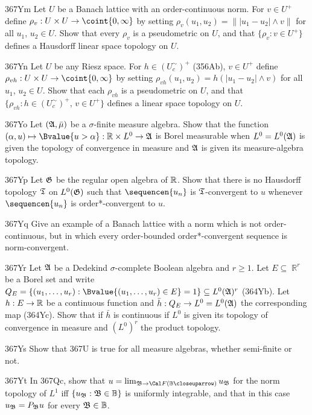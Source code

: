 {\spheader 367Ym Let $U$ be a Banach lattice with an order-continuous
norm.   For $v\in U^+$ define $\rho_v:U\times U\to\coint{0,\infty}$ by
setting $\rho_v(u_1,u_2)=\||u_1-u_2|\wedge v\|$ for all $u_1$, 
$u_2\in U$.   Show that every $\rho_v$ is a pseudometric on $U$, and that $\{\rho_v:v\in U^+\}$ defines a Hausdorff linear space topology on $U$.
     
\spheader 367Yn Let $U$ be any Riesz space.   For $h\in(U^{\sim}_c)^+$
(356Ab), $v\in U^+$ define $\rho_{vh}:U\times U\to\coint{0,\infty}$ by
setting $\rho_{vh}(u_1,u_2)=h(|u_1-u_2|\wedge v)$ for all $u_1$, $u_2\in
U$.   Show that each $\rho_{vh}$ is a pseudometric on $U$, and that
$\{\rho_{vh}:h\in(U^{\sim}_c)^+,\,v\in U^+\}$ defines a linear space
topology on $U$.
     
\spheader 367Yo Let $(\frak A,\bar\mu)$ be a $\sigma$-finite measure
algebra.   Show that the function
$(\alpha,u)\mapsto\Bvalue{u>\alpha}:\Bbb R\times L^0\to\frak A$ is Borel
measurable when $L^0=L^0(\frak A)$ is given the topology of convergence
in measure and $\frak A$ is given its measure-algebra topology.
     
\spheader 367Yp Let $\frak G$ be the regular open algebra of $\Bbb R$.
Show that there is no Hausdorff topology $\frak T$ on $L^0(\frak G)$
such that $\sequencen{u_n}$ is $\frak T$-convergent to $u$ whenever
$\sequencen{u_n}$ is order*-convergent to $u$.   
     
\spheader 367Yq Give an example of a Banach lattice with a norm which is
not order-continuous, but in which every order-bounded
order*-convergent sequence
is norm-convergent.
     
\spheader 367Yr Let $\frak A$ be a Dedekind $\sigma$-complete Boolean
algebra and $r\ge 1$.   Let $E\subseteq\BbbR^r$ be a Borel set and
write $Q_E=\{(u_1,\ldots,u_r):\Bvalue{(u_1,\ldots,u_r)\in E}=1\}
\subseteq L^0(\frak A)^r$ (364Yb).   Let $h:E\to\Bbb R$ be a
continuous function and $\bar h:Q_E\to L^0=L^0(\frak A)$ the 
corresponding map
(364Yc).   Show that if $\bar h$ is continuous if $L^0$ is given its
topology of convergence in measure and $(L^0)^r$ the product topology.
     
\spheader 367Ys Show that 367U is true for all measure algebras,
whether semi-finite or not.

\spheader 367Yt In 367Qc, show that 
$u=\lim_{\frak B\to\Cal F(\Bbb B\closeuparrow)}u_{\frak B}$ for the norm
topology of $L^1$ iff $\{u_{\frak B}:\frak B\in\Bbb B\}$
is uniformly integrable, and that in this case
$u_{\frak B}=P_{\frak B}u$ for every $\frak B\in\Bbb B$.
}%
     
